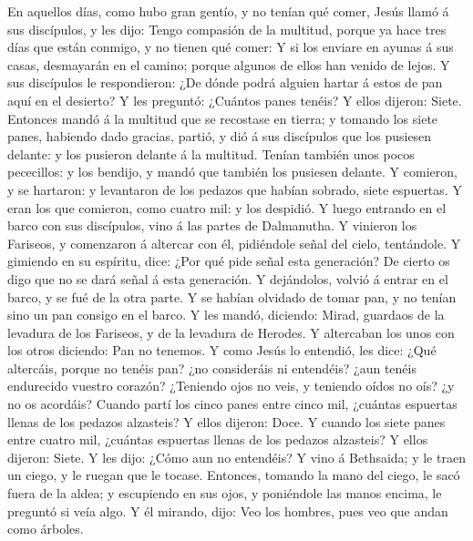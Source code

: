  En aquellos días, como hubo gran gentío, y no tenían qué
comer, Jesús llamó á sus discípulos, y les dijo:  Tengo
compasión de la multitud, porque ya hace tres días que están conmigo, y
no tienen qué comer:  Y si los enviare en ayunas á sus
casas, desmayarán en el camino; porque algunos de ellos han venido de
lejos.  Y sus discípulos le respondieron: ¿De dónde podrá
alguien hartar á estos de pan aquí en el desierto?  Y les
preguntó: ¿Cuántos panes tenéis? Y ellos dijeron: Siete. 
Entonces mandó á la multitud que se recostase en tierra; y tomando los
siete panes, habiendo dado gracias, partió, y dió á sus discípulos que
los pusiesen delante: y los pusieron delante á la multitud. 
Tenían también unos pocos pececillos: y los bendijo, y mandó que también
los pusiesen delante.  Y comieron, y se hartaron: y
levantaron de los pedazos que habían sobrado, siete espuertas.
 Y eran los que comieron, como cuatro mil: y los despidió.
 Y luego entrando en el barco con sus discípulos, vino á
las partes de Dalmanutha.  Y vinieron los Fariseos, y
comenzaron á altercar con él, pidiéndole señal del cielo, tentándole.
 Y gimiendo en su espíritu, dice: ¿Por qué pide señal esta
generación? De cierto os digo que no se dará señal á esta generación.
 Y dejándolos, volvió á entrar en el barco, y se fué de la
otra parte.  Y se habían olvidado de tomar pan, y no tenían
sino un pan consigo en el barco.  Y les mandó, diciendo:
Mirad, guardaos de la levadura de los Fariseos, y de la levadura de
Herodes.  Y altercaban los unos con los otros diciendo: Pan
no tenemos.  Y como Jesús lo entendió, les dice: ¿Qué
altercáis, porque no tenéis pan? ¿no consideráis ni entendéis? ¿aun
tenéis endurecido vuestro corazón?  ¿Teniendo ojos no veis,
y teniendo oídos no oís? ¿y no os acordáis?  Cuando partí
los cinco panes entre cinco mil, ¿cuántas espuertas llenas de los
pedazos alzasteis? Y ellos dijeron: Doce.  Y cuando los
siete panes entre cuatro mil, ¿cuántas espuertas llenas de los pedazos
alzasteis? Y ellos dijeron: Siete.  Y les dijo: ¿Cómo aun
no entendéis?  Y vino á Bethsaida; y le traen un ciego, y
le ruegan que le tocase.  Entonces, tomando la mano del
ciego, le sacó fuera de la aldea; y escupiendo en sus ojos, y poniéndole
las manos encima, le preguntó si veía algo.  Y él mirando,
dijo: Veo los hombres, pues veo que andan como árboles. 
